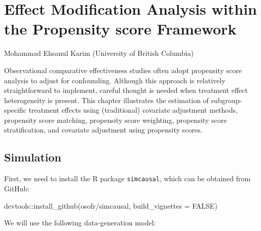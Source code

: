 \documentclass[
  letterpaper,
  DIV=11,
  numbers=noendperiod]{scrreprt}
\newenvironment{Shaded}{\begin{snugshade}}{\end{snugshade}}
\newcommand{\AttributeTok}[1]{\textcolor[rgb]{0.40,0.45,0.13}{#1}}
\newcommand{\ConstantTok}[1]{\textcolor[rgb]{0.56,0.35,0.01}{#1}}
\newcommand{\FunctionTok}[1]{\textcolor[rgb]{0.28,0.35,0.67}{#1}}
\newcommand{\NormalTok}[1]{\textcolor[rgb]{0.00,0.23,0.31}{#1}}
\newcommand{\SpecialCharTok}[1]{\textcolor[rgb]{0.37,0.37,0.37}{#1}}
\newcommand{\StringTok}[1]{\textcolor[rgb]{0.13,0.47,0.30}{#1}}
\begin{document}


\hypertarget{effect-modification-analysis-within-the-propensity-score-framework}{%
\chapter{Effect Modification Analysis within the Propensity score
Framework}\label{effect-modification-analysis-within-the-propensity-score-framework}}

Mohammad Ehsanul Karim (University of British Columbia)

\hfill\break

Observational comparative effectiveness studies often adopt propensity
score analysis to adjust for confounding. Although this approach is
relatively straightforward to implement, careful thought is needed when
treatment effect heterogeneity is present. This chapter illustrates the
estimation of subgroup-specific treatment effects using (traditional)
covariate adjustment methods, propensity score matching, propensity
score weighting, propensity score stratification, and covariate
adjustment using propensity scores.

\hypertarget{simulation}{%
\section{Simulation}\label{simulation}}

First, we need to install the R package \texttt{simcausal}, which can be
obtained from GitHub:

\begin{Shaded}
\begin{Highlighting}[]
\NormalTok{devtools}\SpecialCharTok{::}\FunctionTok{install\_github}\NormalTok{(}\StringTok{\textquotesingle{}osofr/simcausal\textquotesingle{}}\NormalTok{, }\AttributeTok{build\_vignettes =} \ConstantTok{FALSE}\NormalTok{)}
\end{Highlighting}
\end{Shaded}

We will use the following data-generation model:
\end{document}
